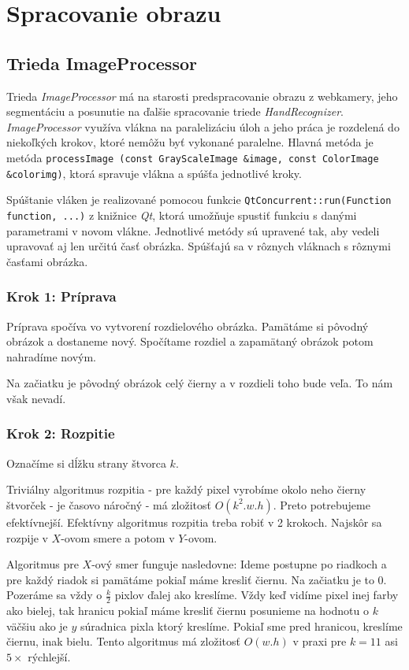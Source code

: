 \section{Spracovanie obrazu}
\subsection{Trieda ImageProcessor}
Trieda \textit{ImageProcessor} má na starosti predspracovanie obrazu z webkamery, jeho segmentáciu a posunutie na ďalšie spracovanie triede \textit{HandRecognizer}. \textit{ImageProcessor} využíva vlákna na paralelizáciu úloh a jeho práca je rozdelená do niekoľkých krokov, ktoré nemôžu byť vykonané paralelne. Hlavná metóda je metóda {\tt processImage (const GrayScaleImage \&image, const ColorImage \&colorimg)}, ktorá spravuje vlákna a spúšťa jednotlivé kroky. 

Spúštanie vláken je realizované pomocou funkcie {\tt QtConcurrent::run(Function function, ...)} z knižnice \textit{Qt}, ktorá umožňuje spustiť funkciu s danými parametrami v novom vlákne. Jednotlivé metódy sú upravené tak, aby vedeli upravovať aj len určitú časť obrázka. Spúšťajú sa v rôznych vláknach s rôznymi časťami obrázka. %

\subsubsection{Krok 1: Príprava}
Príprava spočíva vo vytvorení rozdielového obrázka. Pamätáme si pôvodný obrázok a dostaneme nový. Spočítame rozdiel a zapamätaný obrázok potom nahradíme novým.

Na začiatku je pôvodný obrázok celý čierny a v rozdieli toho bude veľa. To nám však nevadí. 

\subsubsection{Krok 2: Rozpitie}
Označíme si dĺžku strany štvorca $k$.

Triviálny algoritmus rozpitia - pre každý pixel vyrobíme okolo neho čierny štvorček - je časovo náročný - má zložitosť $O(k^2.w.h)$. Preto potrebujeme efektívnejší. 
Efektívny algoritmus rozpitia treba robiť v 2 krokoch. Najskôr sa rozpije v $X$-ovom smere a potom v $Y$-ovom.

Algoritmus pre $X$-ový smer funguje nasledovne: Ideme postupne po riadkoch a pre každý riadok si pamätáme pokiaľ máme kresliť čiernu.
Na začiatku je to 0. Pozeráme sa vždy o $\frac{k}{2}$ pixlov ďalej ako kreslíme.
Vždy keď vidíme pixel inej farby ako bielej, tak hranicu pokiaľ máme kresliť čiernu posunieme na hodnotu o $k$ väčšiu ako je $y$ súradnica pixla ktorý kreslíme. Pokiaľ sme pred hranicou, kreslíme čiernu, inak bielu. Tento algoritmus má zložitosť $O(w.h)$ v praxi pre $k=11$ asi $5\times$ rýchlejší.  

